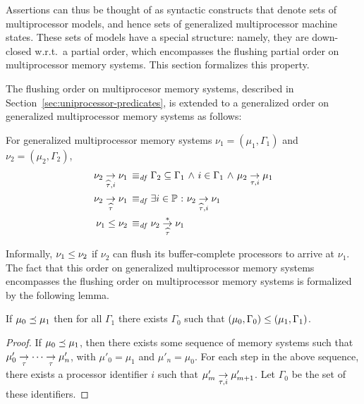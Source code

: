 \documentclass[11pt]{report}         %
\begin{document}
Assertions can thus be thought of as syntactic constructs that denote sets of multiprocessor models, and hence sets of generalized multiprocessor machine states. These sets of models have a special structure: namely, they are down-closed w.r.t.\ a partial order, which encompasses the flushing partial order on multiprocessor memory systems. This section formalizes this property. 

The flushing order on multiprocesor memory systems, described in Section~\ref{sec:uniprocessor-predicates}, is extended to a generalized order on generalized multiprocessor memory systems as follows: 
\begin{definition}
  For generalized multiprocessor memory systems $\nu_1 = (\mu_1,\Gamma_1)$ and $\nu_2 = (\mu_2,\Gamma_2)$, \begin{align*}
    \nu_2 \underset{\widehat{\tau},i}{\rightarrow} \nu_1 \operatorname{\;\equiv_{\mathit{df}}\;} & \Gamma_2 \subseteq \Gamma_1 \operatorname{\,\wedge\,} i \in \Gamma_1 \operatorname{\,\wedge\,} \mu_2 \underset{\tau,i}{\rightarrow} \mu_1 \\ 
    \nu_2 \underset{\widehat{\tau}}{\rightarrow} \nu_1 \operatorname{\;\equiv_{\mathit{df}}\;} & \exists i \in \mathbb{P} \operatorname{\,:\,} \nu_2 \underset{\widehat{\tau},i}{\rightarrow} \nu_1 \\ 
    \nu_1 \leq \nu_2 \operatorname{\;\equiv_{\mathit{df}}\;} & \nu_2 \overset{\ast}{\underset{\widehat{\tau}}{\rightarrow}} \nu_1
  \end{align*} 
\end{definition} 

Informally, $\nu_1 \leq \nu_2$ if $\nu_2$ can flush its buffer-complete processors to arrive at $\nu_1$. The fact that this order on generalized multiprocessor memory systems encompasses the flushing order on multiprocessor memory systems is formalized by the following lemma. 

\begin{proposition}
  \label{lem:generalized-order-encompasses-flushing-order}
  If $\mu_0 \preceq \mu_1$ then for all $\Gamma_1$ there exists $\Gamma_0$ such that $(\mu_0,\Gamma_0) \leq (\mu_1,\Gamma_1)$. 
\end{proposition}

\begin{proof}
  If $\mu_0 \preceq \mu_1$, then there exists some sequence of memory systems such that $\mu'_0 \underset{\tau}{\rightarrow} \cdots \underset{\tau}{\rightarrow} \mu'_n$, with $\mu'_0 = \mu_1$ and $\mu'_n = \mu_0$. For each step in the above sequence, there exists a processor identifier $i$ such that $\mu'_m \underset{\tau,i}{\rightarrow} \mu'_{m+1}$. Let $\Gamma_0$ be the set of these identifiers. 
\end{proof}
\end{document}
